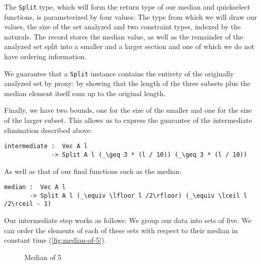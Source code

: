 The \texttt{Split} type, which will form the return type of our median and quickselect functions, is parameterized by four values: The type from which we will draw our values, the size of the set analyzed and two constraint types, indexed by the naturals. The record stores the median value, as well as the remainder of the analyzed set split into a smaller and a larger section and one of which we do not have ordering information.

We guarantee that a \texttt{Split} instance contains the entirety of the originally analyzed set by proxy: by showing that the length of the three subsets plus the median element itself sum up to the original length.

Finally, we have two bounds, one for the size of the smaller and one for the size of the larger subset. This allows us to express the guarantee of the intermediate elimination described above:

\begin{lstlisting}
intermediate :  Vec A l
             -> Split A l (_\geq 3 * (l / 10)) (_\geq 3 * (l / 10))
\end{lstlisting}

As well as that of our final functions such as the median:

\begin{lstlisting}
median :  Vec A l
       -> Split A l (_\equiv \lfloor l /2\rfloor) (_\equiv \lceil l /2\rceil - 1)
\end{lstlisting}


Our intermediate step works as follows: We group our data into sets of five. We can order the elements of each of these sets with respect to their median in constant time (\autoref{fig:median-of-5}).

\begin{figure}[h]
\begin{center}
        
\end{center}
\caption{Median of 5}
\label{fig:median-of-5}
\end{figure}

